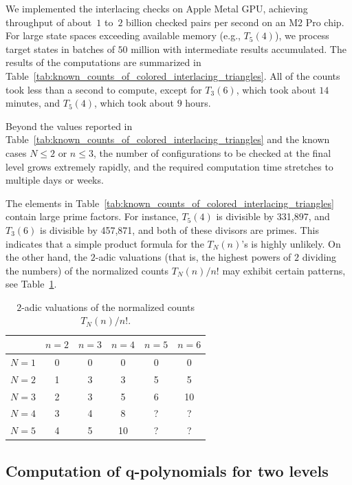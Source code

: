 \documentclass[pdftex]{sigma}
\numberwithin{equation}{section}
\theoremstyle{definition}
\begin{document}
We implemented the interlacing checks on Apple Metal GPU, achieving throughput
of about~$1$ to~$2$ billion checked pairs per second on an M2 Pro chip.
For large state spaces exceeding available memory (e.g., $T_5(4)$), we process
target states in batches of $50$ million with intermediate results accumulated.
The results of the computations are summarized in
Table~\ref{tab:known_counts_of_colored_interlacing_triangles}.
All of the counts took less than a second to compute, except for $T_3(6)$, which
took about $14$ minutes, and $T_5(4)$, which took about $9$ hours.

Beyond the values reported in
Table~\ref{tab:known_counts_of_colored_interlacing_triangles} and the known cases
$N\le 2$ or $n\le 3$, the number of configurations to be checked at the final
level grows extremely rapidly, and the required computation time stretches to
multiple days or weeks.

The elements in Table~\ref{tab:known_counts_of_colored_interlacing_triangles} contain
large prime factors.
For instance, $T_5(4)$ is divisible by 331,897, and $T_3(6)$ is divisible by
457,871, and both of these divisors are primes.
This indicates that a simple product formula for the $T_N(n)$'s is highly
unlikely.
On the other hand, the $2$-adic valuations (that is, the highest powers of $2$
dividing the numbers) of the normalized counts $T_N(n)/n!$ may exhibit certain
patterns, see Table~\ref{tab:2_adic_valuations}.

\begin{table}[htpb]
	\centering
	\begin{tabular}{|c|c|c|c|c|c|}
		\hline               & $n=2$ & $n=3$ & $n=4$ & $n=5$ & $n=6$ \\
		\hline
		$N=1$ & 0     & 0     & 0     & 0     & 0 \\
		\hline
		$N=2$ & 1     & 3     & 3     & 5     & 5 \\
		\hline
		$N=3$ & 2     & 3     & 5     & 6     & 10 \\
		\hline
		$N=4$ & 3     & 4     & 8     & ?     & ? \\
		\hline
		$N=5$ & 4     & 5     & 10    & ?     & ? \\
		\hline
	\end{tabular}
	\caption{$2$-adic valuations of the normalized counts $T_N(n)/n!$.}\label{tab:2_adic_valuations}
\end{table}

\subsection[Computation of q-polynomials for two levels]{Computation of $\boldsymbol{q}$-polynomials for two levels}
\label{subsec:q_data}
\end{document}
